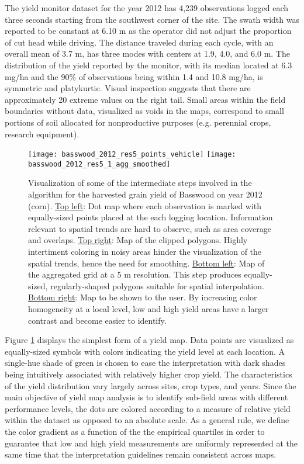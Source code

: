  The yield monitor dataset for the year 2012
has 4,239 observations logged each three seconds starting from the
southwest corner of the site. The swath width was reported to be
constant at 6.10 m as the operator did not adjust the proportion of
cut head while driving. The distance traveled during each cycle, with
an overall mean of 3.7 m, has three modes with centers at 1.9, 4.0,
and 6.0 m. The distribution of the yield reported by the monitor, with
its median located at 6.3 mg/ha and the 90\% of observations being
within 1.4 and 10.8 mg/ha, is symmetric and platykurtic. Visual
inspection suggests that there are approximately 20 extreme values on
the right tail. Small areas within the field boundaries without data,
visualized as voids in the maps, correspond to small portions of soil
allocated for nonproductive purposes (e.g. perennial crops, research
equipment).

\begin{figure}[h!]  \centering
  \texttt{[image: basswood\_2012\_res5\_points\_vehicle]}
  \texttt{[image: basswood\_2012\_res5\_1\_agg\_smoothed]}
  \caption{Visualization of some of the intermediate steps involved
    in the algorithm for the harvested grain yield of Basswood on year
    2012 (corn). \underline{Top left}: Dot map where each observation is
    marked with equally-sized points placed at the each logging
    location. Information relevant to spatial trends are hard to observe,
    such as area coverage and overlaps. \underline{Top right}: Map of the
    clipped polygons. Highly intertiment coloring in noisy areas hinder
    the visualization of the spatial trends, hence the need for
    smoothing. \underline{Bottom left}: Map of the aggregated grid at a 5
    m resolution. This step produces equally-sized, regularly-shaped
    polygons suitable for spatial interpolation. \underline{Bottom right}:
    Map to be shown to the user. By increasing color homogeneity at a
    local level, low and high yield areas have a larger contrast and
    become easier to identify.}
  \label{fig:basswood2012-main-steps}
\end{figure}

 Figure \ref{fig:basswood2012-main-steps}
displays the simplest form of a yield map. Data points are visualized
as equally-sized symbols with colors indicating the yield level at
each location. A single-hue shade of green is chosen to ease the
interpretation with dark shades being intuitively associated with
relatively higher crop yield. The characteristics of the yield
distribution vary largely across sites, crop types, and years. Since
the main objective of yield map analysis is to identify sub-field
areas with different performance levels, the dots are colored
according to a measure of relative yield within the dataset as opposed
to an absolute scale. As a general rule, we define the color gradient
as a function of the the empirical quartiles in order to guarantee
that low and high yield measurements are uniformly represented at the
same time that the interpretation guidelines remain consistent across
maps.

